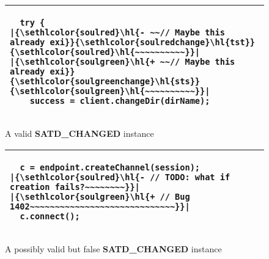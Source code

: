 \documentclass[3p]{elsarticle}
\DeclareRobustCommand{\hlremove}[1]{{\sethlcolor{soulred}\hl{#1}}}
\DeclareRobustCommand{\hladd}[1]{{\sethlcolor{soulgreen}\hl{#1}}}
\DeclareRobustCommand{\hlremovechange}[1]{{\sethlcolor{soulredchange}\hl{#1}}}
\DeclareRobustCommand{\hladdchange}[1]{{\sethlcolor{soulgreenchange}\hl{#1}}}
\begin{document}
\begin{enumerate}



\begin{figure}
    \centering
    \begin{tabular}{|p{25.2em}|}
    \hline
        \begin{lstlisting}
  try {
|\hlremove{- ~~// Maybe this already exi}\hlremovechange{tst}\hlremove{~~~~~~~~~~}|
|\hladd   {+ ~~// Maybe this already exi}\hladdchange{sts}\hladd{~~~~~~~~~~}|
    success = client.changeDir(dirName);
        \end{lstlisting}
    \\\hline
    \end{tabular}
    \caption{A valid \textbf{SATD\_CHANGED} instance}
    \label{fig:change_positive}
\end{figure}

\begin{figure}
    \centering
    \begin{tabular}{|p{25.2em}|}
    \hline
        \begin{lstlisting}
  c = endpoint.createChannel(session);
|\hlremove{- // TODO: what if creation fails?~~~~~~~~}|
|\hladd   {+ // Bug 1402~~~~~~~~~~~~~~~~~~~~~~~~~~~~~}|
  c.connect();
        \end{lstlisting}
    \\\hline
    \end{tabular}
    \caption{A possibly valid but false \textbf{SATD\_CHANGED} instance}
    \label{fig:change_negative}
\end{figure}





\end{enumerate}
\end{document}
